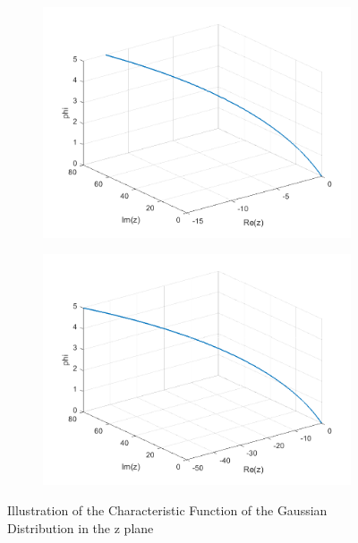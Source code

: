 \documentclass[a4paper,11pt]{article}
\begin{document}
\begin{figure}[!h]
\begin{subfigure}[c]{0.3\textwidth}
\end{subfigure}
\begin{subfigure}[c]{0.3\textwidth}
\includegraphics[width=\linewidth]{plot6_musg41.png}
\end{subfigure}
\begin{subfigure}[c]{0.3\textwidth}
\includegraphics[width=\linewidth]{plot6_musg42.png}
\end{subfigure}
\caption{Illustration of the Characteristic Function of the Gaussian Distribution in the z plane}
\label{zplane2}
\end{figure}
\newpage
\newpage
\end{document}
